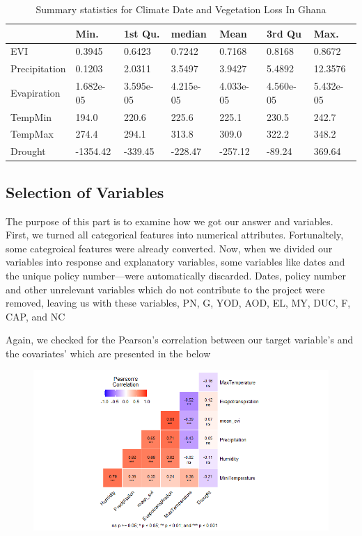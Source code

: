 \begin{table}[]
	\label{Summary Statistics}
	\caption{Summary statistics for Climate Date and Vegetation Loss In Ghana}
	\centering
	\begin{tabularx}{\textwidth}{|l*{3}{X|}*{3}{X|}}
		\toprule
		                   & Min.      & 1st Qu.& median & Mean & 3rd Qu & Max.  \\ \midrule
		EVI                &   0.3945  & 0.6423 & 0.7242 & 0.7168  & 0.8168&0.8672 \\
		Precipitation      &   0.1203  & 2.0311& 3.5497 &  3.9427 & 5.4892&12.3576 \\
		Evapiration & 1.682e-05 &3.595e-05&4.215e-05 &4.033e-05 & 4.560e-05&5.432e-05 \\
		TempMin            &   194.0 & 220.6  & 225.6  & 225.1 & 230.5 &242.7 \\
		TempMax            &   274.4 & 294.1 & 313.8& 309.0  &  322.2&348.2 \\ 
		Drought            &  -1354.42 & -339.45 & -228.47&-257.12 & -89.24&369.64 \\ \bottomrule
	\end{tabularx}
\end{table}
\subsection{Selection of Variables}
The purpose of this part is to examine how we got our answer and variables. First, we turned all categorical features into numerical attributes. Fortunaltely, some categroical features were already converted. Now, when we divided our variables into response and explanatory variables, some variables like dates and the unique policy number—were automatically discarded. Dates, policy number and other unrelevant variables which do not contribute to the project were removed, leaving us with these variables, PN, G, YOD, AOD, EL, MY, DUC, F, CAP, and NC

Again, we checked for the Pearson’s correlation between our target variable’s and the covariates’ which are presented in the below
\begin{figure}
	\centering
	\includegraphics[width=0.7\linewidth]{images/Rplot11}
	\caption{}
	\label{fig:rplot11}
\end{figure}

